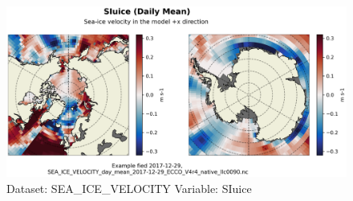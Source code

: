 \begin{figure}[H]
\centering
\includegraphics[width=\textwidth]{../images/plots/native_plots/Sea-Ice_Velocity/SIuice.png}
\caption{Dataset: SEA\_ICE\_VELOCITY Variable: SIuice}
\label{tab:table-SEA_ICE_VELOCITY_SIuice-Plot}
\end{figure}
\pagebreak
